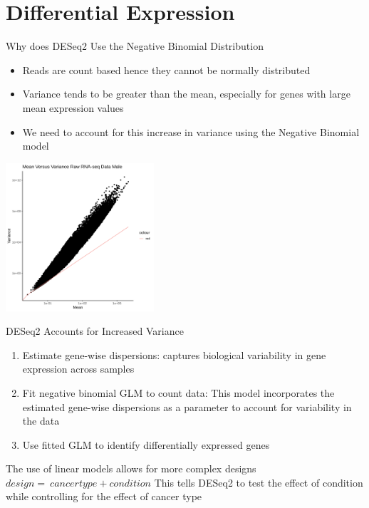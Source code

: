 \documentclass{beamer}
\begin{document}
	\section{Differential Expression}
	\begin{frame}{Why does DESeq2 Use the Negative Binomial Distribution}
		\begin{itemize}
			\item Reads are count based hence they cannot be normally distributed
			\item Variance tends to be greater than the mean, especially for genes with large mean expression values
			\item  We need to account for this increase in variance using the Negative Binomial model 
		\end{itemize}
	\centering \includegraphics[width=5.5cm, height=5.5cm]{all_cancersmean_vs_variance_male.png}
	\end{frame}

	\begin{frame}{DESeq2 Accounts for Increased Variance}
		\begin{enumerate}
			\item Estimate gene-wise dispersions: captures biological variability in gene expression across samples
			\item Fit negative binomial GLM to count data: This model incorporates the estimated gene-wise dispersions as a parameter to account for variability in the data
			\item Use fitted GLM to identify differentially expressed genes \newline
		\end{enumerate}
		The use of linear models allows for more complex designs \newline \newline
		$design = ~cancertype + condition$ \newline \newline
		This tells DESeq2 to test the effect of condition while controlling for the effect of cancer type
	\end{frame}
\end{document}
